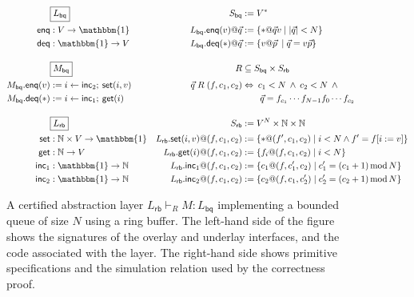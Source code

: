 \documentclass[sigplan,screen]{acmart}
\newcommand{\kw}[1]{\ensuremath{ \mathsf{#1} }}
\begin{document}

\begin{figure*} %
  \begin{minipage}{.9\textwidth}
    \begin{align*}
      & \fbox{$L_\kw{bq}$} &
        S_\kw{bq} &:= V^* \\
      \kw{enq} &: V \rightarrow \mathbbm{1} &
        L_\kw{bq}.\kw{enq}(v)@\vec{q} &:= \{ * @ \vec{q} v \mid |\vec{q}| < N \} \\
      \kw{deq} &: \mathbbm{1} \rightarrow V &
        L_\kw{bq}.\kw{deq}(*)@\vec{q} &:= \{ v @ \vec{p} \: \mid \vec{q} = v \vec{p} \}
      \\[1em]
      & \fbox{$M_\kw{bq}$} &
        R &\subseteq S_\kw{bq} \times S_\kw{rb} \\
      M_\kw{bq}.\kw{enq}(v) &:= i \leftarrow \kw{inc}_2 ; \: \kw{set}(i, v) &
        \vec{q} \mathrel{R} (f, c_1, c_2) &\Leftrightarrow
        \: c_1 < N \:\wedge\: c_2 < N \:\wedge\: {}
      \\
      M_\kw{bq}.\kw{deq}(*) &:= i \leftarrow \kw{inc}_1 ; \: \kw{get}(i) &
        & \qquad \vec{q} = f_{c_1} \cdots f_{N-1} f_0 \cdots f_{c_2}
      \\[1em]
      & \fbox{$L_\kw{rb}$} &
        S_\kw{rb} &:= V^N \times \mathbb{N} \times \mathbb{N}
      \\
      \kw{set} &: \mathbb{N} \times V \rightarrow \mathbbm{1} &
        L_\kw{rb}.\kw{set}(i, v)@(f, c_1, c_2) &:=
        \{ *@(f', c_1, c_2) \mid i < N \wedge f' = f[i := v] \}
      \\
      \kw{get} &: \mathbb{N} \rightarrow V &
        L_\kw{rb}.\kw{get}(i)@(f, c_1, c_2) &:=
        \{ f_i@(f, c_1, c_2) \mid i < N \}
      \\
      \kw{inc}_1 &: \mathbbm{1} \rightarrow \mathbb{N} &
        L_\kw{rb}.\kw{inc}_1@(f, c_1, c_2) &:=
        \{ c_1@(f, c_1', c_2) \mid
           c_1' = (c_1 + 1) \mathop{\mathrm{mod}} N \}
      \\
      \kw{inc}_2 &: \mathbbm{1} \rightarrow \mathbb{N} &
        L_\kw{rb}.\kw{inc}_2@(f, c_1, c_2) &:=
        \{ c_2@(f, c_1, c_2') \mid
           c_2' = (c_2 + 1) \mathop{\mathrm{mod}} N \}
    \end{align*}
  \end{minipage}
  \caption{A certified abstraction layer
    $L_\kw{rb} \vdash_R M : L_\kw{bq}$
    implementing a bounded queue of size $N$
    using a ring buffer.
    The left-hand side of the figure shows
    the signatures of the overlay and underlay interfaces,
    and the code associated with the layer.
    The right-hand side shows primitive specifications
    and the simulation relation used by the correctness proof.}
  \label{fig:cal}
\end{figure*}
\end{document}
